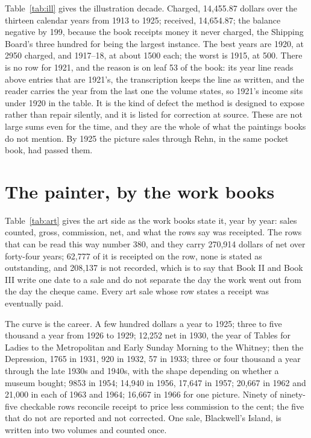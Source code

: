 Table~\ref{tab:ill} gives the illustration decade. Charged, 14,455.87 dollars over the thirteen calendar years from 1913 to 1925; received, 14,654.87; the balance negative by 199, because the book receipts money it never charged, the Shipping Board's three hundred for  being the largest instance. The best years are 1920, at 2950 charged, and 1917--18, at about 1500 each; the worst is 1915, at 500. There is no row for 1921, and the reason is on leaf 53 of the book: its year line reads  above entries that are 1921's, the transcription keeps the line as written, and the reader carries the year from the last one the volume states, so 1921's income sits under 1920 in the table. It is the kind of defect the method is designed to expose rather than repair silently, and it is listed for correction at source. These are not large sums even for the time, and they are the whole of what the paintings books do not mention. By 1925 the picture sales through Rehn, in the same pocket book, had passed them.

\section{The painter, by the work books}

Table~\ref{tab:art} gives the art side as the work books state it, year by year: sales counted, gross, commission, net, and what the rows say was receipted. The rows that can be read this way number 380, and they carry 270,914 dollars of net over forty-four years; 62,777 of it is receipted on the row, none is stated as outstanding, and 208,137 is not recorded, which is to say that Book II and Book III write one date to a sale and do not separate the day the work went out from the day the cheque came. Every art sale whose row states a receipt was eventually paid.

The curve is the career. A few hundred dollars a year to 1925; three to five thousand a year from 1926 to 1929; 12,252 net in 1930, the year of Tables for Ladies to the Metropolitan and Early Sunday Morning to the Whitney; then the Depression, 1765 in 1931, 920 in 1932, 57 in 1933; three or four thousand a year through the late 1930s and 1940s, with the shape depending on whether a museum bought; 9853 in 1954; 14,940 in 1956, 17,647 in 1957; 20,667 in 1962 and 21,000 in each of 1963 and 1964; 16,667 in 1966 for one picture. Ninety of ninety-five checkable rows reconcile receipt to price less commission to the cent; the five that do not are reported and not corrected. One sale, Blackwell's Island, is written into two volumes and counted once.


